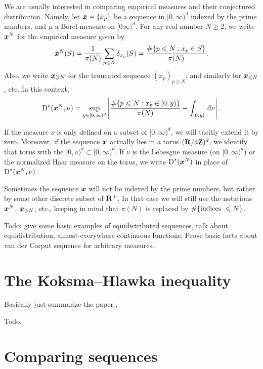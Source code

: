 We are usually interested in comparing empirical measures and their conjectured 
distribution. Namely, let ${\boldsymbol x} = \{x_p\}$ be a sequence in $[0,\infty)^d$ 
indexed by the prime numbers, and $\mu$ a Borel measure on $[0\infty)^d$. For 
any real number $N\geqslant 2$, we write ${\boldsymbol x}^N$ for the empirical measure 
given by 
\[
	{\boldsymbol x}^N(S) = \frac{1}{\pi(N)} \sum_{p\leqslant N} \delta_{x_p}(S) = \frac{\# \{p\leqslant N : x_p\in S\}}{\pi(N)} .
\]
Also, we write ${\boldsymbol x}_{\geqslant N}$ for the truncated sequence 
$(x_p)_{p\geqslant N}$, and similarly for ${\boldsymbol x}_{\leqslant N}$, etc. In this 
context, 
\[
	\operatorname{D}^\star({\boldsymbol x}^N,\nu) = \sup_{y\in [0,\infty)^d} \left| \frac{\# \{p\leqslant N : x_p \in [0,y)\}}{\pi(N)} - \int_{[0,y)} \, \mathrm{d}\nu\right| .
\]

If the measure $\nu$ is only defined on a subset of $[0,\infty)^d$, we will 
tacitly extend it by zero. Moreover, if the sequence ${\boldsymbol x}$ actually lies in a 
torus $(\mathbf{R}/a \mathbf{Z})^d$, we identify that torus with the 
$[0,a)^d\subset [0,\infty)^d$. If $\nu$ is the Lebesgue measure (on 
$[0,\infty)^d$) or the normalized Haar measure on the torus, we write 
$\operatorname{D}^\star({\boldsymbol x}^N)$ in place of $\operatorname{D}^\star({\boldsymbol x}^N, \nu)$. 

Sometimes the sequence ${\boldsymbol x}$ will not be indexed by the prime numbers, but 
rather by some other discrete subset of $\mathbf{R}^+$. In that case we will still 
use the notations ${\boldsymbol x}^N$, ${\boldsymbol x}_{\geqslant N}$, etc., keeping in mind that 
$\pi(N)$ is replaced by $\#\{\textnormal{indices }\leqslant N\}$. 

Todo: give some basic examples of equidistributed sequences, talk about 
equidistribution, almost-everywhere continuous functions. Prove basic facts 
about van der Corput sequence for arbitrary measures. 





\section{The Koksma--Hlawka inequality}

Basically just summarize the paper \cite{okten-1999}. 


\begin{theorem}
Todo.
\end{theorem}





\section{Comparing sequences}

